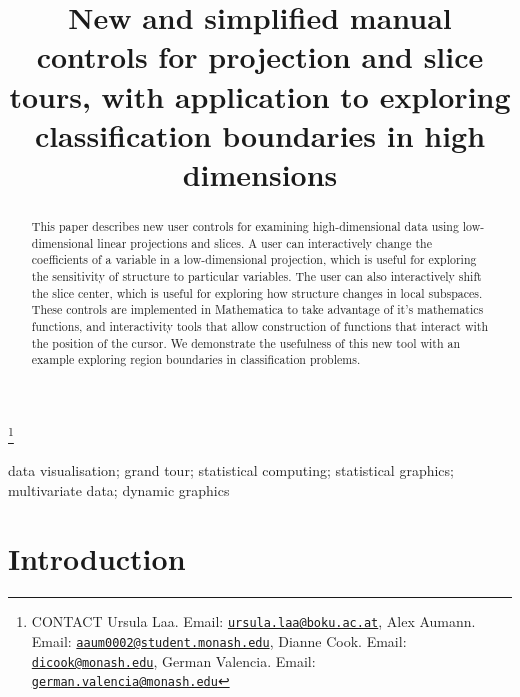 \documentclass[]{interact}
\theoremstyle{plain}%
\theoremstyle{definition}
\theoremstyle{remark}
\begin{document}

\title{New and simplified manual controls for projection and slice
tours, with application to exploring classification boundaries in high
dimensions}


\author{
}

\thanks{CONTACT Ursula
Laa. Email: \href{mailto:ursula.laa@boku.ac.at}{\nolinkurl{ursula.laa@boku.ac.at}}, Alex
Aumann. Email: \href{mailto:aaum0002@student.monash.edu}{\nolinkurl{aaum0002@student.monash.edu}}, Dianne
Cook. Email: \href{mailto:dicook@monash.edu}{\nolinkurl{dicook@monash.edu}}, German
Valencia. Email: \href{mailto:german.valencia@monash.edu}{\nolinkurl{german.valencia@monash.edu}}}

\maketitle

\begin{abstract}
This paper describes new user controls for examining high-dimensional
data using low-dimensional linear projections and slices. A user can
interactively change the coefficients of a variable in a low-dimensional
projection, which is useful for exploring the sensitivity of structure
to particular variables. The user can also interactively shift the slice
center, which is useful for exploring how structure changes in local
subspaces. These controls are implemented in Mathematica to take
advantage of it's mathematics functions, and interactivity tools that
allow construction of functions that interact with the position of the
cursor. We demonstrate the usefulness of this new tool with an example
exploring region boundaries in classification problems.
\end{abstract}

\begin{keywords}
data visualisation; grand tour; statistical computing; statistical
graphics; multivariate data; dynamic graphics
\end{keywords}

\hypertarget{introduction}{%
\section{Introduction}\label{introduction}}
\end{document}
